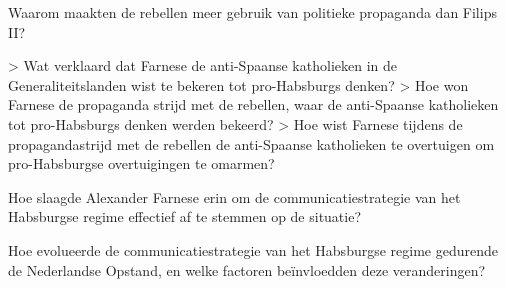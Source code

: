 \documentclass[11pt]{amsart}
\begin{document}






Waarom maakten de rebellen meer gebruik van politieke propaganda dan Filips II?

> Wat verklaard dat Farnese de anti-Spaanse katholieken in de Generaliteitslanden wist te bekeren tot pro-Habsburgs denken?
> Hoe won Farnese de propaganda strijd met de rebellen, waar de anti-Spaanse katholieken tot pro-Habsburgs denken werden bekeerd?
> Hoe wist Farnese tijdens de propagandastrijd met de rebellen de anti-Spaanse katholieken te overtuigen om pro-Habsburgse overtuigingen te omarmen?

Hoe slaagde Alexander Farnese erin om de communicatiestrategie van het Habsburgse regime effectief af te stemmen op de situatie? 


Hoe evolueerde de communicatiestrategie van het Habsburgse regime gedurende de Nederlandse Opstand, en welke factoren beïnvloedden deze veranderingen?
\end{document}
